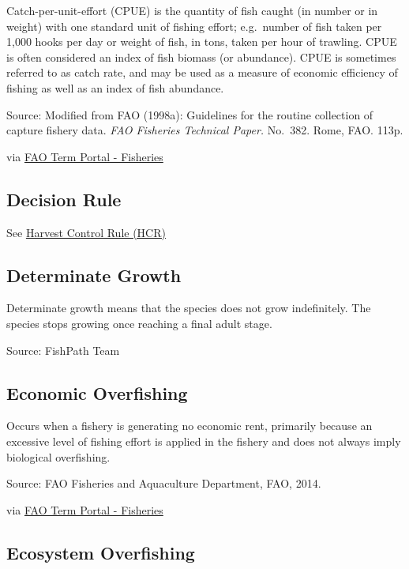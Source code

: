 \documentclass[
  11pt,
]{book}
\begin{document}
Catch-per-unit-effort (CPUE) is the quantity of fish caught (in number or in weight) with one standard unit of fishing effort; e.g.~number of fish taken per 1,000 hooks per day or weight of fish, in tons, taken per hour of trawling. CPUE is often considered an index of fish biomass (or abundance). CPUE is sometimes referred to as catch rate, and may be used as a measure of economic efficiency of fishing as well as an index of fish abundance.

Source: Modified from FAO (1998a): Guidelines for the routine collection of capture fishery data. \emph{FAO Fisheries Technical Paper.} No.~382. Rome, FAO. 113p.

via \href{http://www.fao.org/fishery/glossary/en}{FAO Term Portal - Fisheries}

\hypertarget{decision-rule}{%
\subsection{Decision Rule}\label{decision-rule}}

See \protect\hyperlink{harvest-control-rule-hcr}{Harvest Control Rule (HCR)}

\hypertarget{determinate-growth}{%
\subsection{Determinate Growth}\label{determinate-growth}}

Determinate growth means that the species does not grow indefinitely. The species stops growing once reaching a final adult stage.

Source: FishPath Team

\hypertarget{economic-overfishing}{%
\subsection{Economic Overfishing}\label{economic-overfishing}}

Occurs when a fishery is generating no economic rent, primarily because an excessive level of fishing effort is applied in the fishery and does not always imply biological overfishing.

Source: FAO Fisheries and Aquaculture Department, FAO, 2014.

via \href{http://www.fao.org/fishery/glossary/en}{FAO Term Portal - Fisheries}

\hypertarget{ecosystem-overfishing}{%
\subsection{Ecosystem Overfishing}\label{ecosystem-overfishing}}
\end{document}
